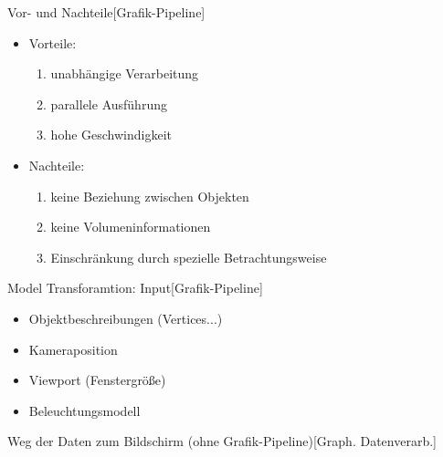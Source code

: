 \documentclass[a7paper,print]{kartei}
\begin{document}
\begin{karte}[CGIS]{Vor- und Nachteile}[Grafik-Pipeline]
\begin{itemize}
\item Vorteile:
	\begin{enumerate}
	\item unabhängige Verarbeitung
	\item parallele Ausführung
	\item hohe Geschwindigkeit
	\end{enumerate}
\item Nachteile:
	\begin{enumerate}
	\item keine Beziehung zwischen Objekten
	\item keine Volumeninformationen
	\item Einschränkung durch spezielle Betrachtungsweise
	\end{enumerate}
\end{itemize}
\end{karte}

\begin{karte}[CGIS]{Model Transforamtion: Input}[Grafik-Pipeline]
\begin{itemize}
\item Objektbeschreibungen (Vertices...)
\item Kameraposition
\item Viewport (Fenstergröße)
\item Beleuchtungsmodell
\end{itemize}
\end{karte}

\begin{karte}[CGIS]{Weg der Daten zum Bildschirm (ohne Grafik-Pipeline)}[Graph. Datenverarb.]
\end{karte}
\end{document}
